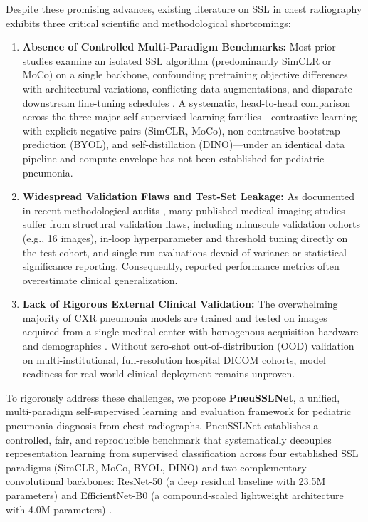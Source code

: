 \documentclass[journal,article,submit,moreauthors,pdftex]{Definitions/tsp}
\begin{document}
Despite these promising advances, existing literature on SSL in chest radiography exhibits three critical scientific and methodological shortcomings:
\begin{enumerate}
    \item \textbf{Absence of Controlled Multi-Paradigm Benchmarks:} Most prior studies examine an isolated SSL algorithm (predominantly SimCLR or MoCo) on a single backbone, confounding pretraining objective differences with architectural variations, conflicting data augmentations, and disparate downstream fine-tuning schedules \cite{Gazda21,Han21,SinghMLVICX24}. A systematic, head-to-head comparison across the three major self-supervised learning families---contrastive learning with explicit negative pairs (SimCLR, MoCo), non-contrastive bootstrap prediction (BYOL), and self-distillation (DINO)---under an identical data pipeline and compute envelope has not been established for pediatric pneumonia.
    \item \textbf{Widespread Validation Flaws and Test-Set Leakage:} As documented in recent methodological audits \cite{Bundele24}, many published medical imaging studies suffer from structural validation flaws, including minuscule validation cohorts (e.g., 16 images), in-loop hyperparameter and threshold tuning directly on the test cohort, and single-run evaluations devoid of variance or statistical significance reporting. Consequently, reported performance metrics often overestimate clinical generalization.
    \item \textbf{Lack of Rigorous External Clinical Validation:} The overwhelming majority of CXR pneumonia models are trained and tested on images acquired from a single medical center with homogenous acquisition hardware and demographics \cite{Kermany18,ElAsnaoui21}. Without zero-shot out-of-distribution (OOD) validation on multi-institutional, full-resolution hospital DICOM cohorts, model readiness for real-world clinical deployment remains unproven.
\end{enumerate}

To rigorously address these challenges, we propose \textbf{PneuSSLNet}, a unified, multi-paradigm self-supervised learning and evaluation framework for pediatric pneumonia diagnosis from chest radiographs. PneuSSLNet establishes a controlled, fair, and reproducible benchmark that systematically decouples representation learning from supervised classification across four established SSL paradigms (SimCLR, MoCo, BYOL, DINO) and two complementary convolutional backbones: ResNet-50 (a deep residual baseline with 23.5M parameters) \cite{He16} and EfficientNet-B0 (a compound-scaled lightweight architecture with 4.0M parameters) \cite{Tan19}. 
\end{document}
